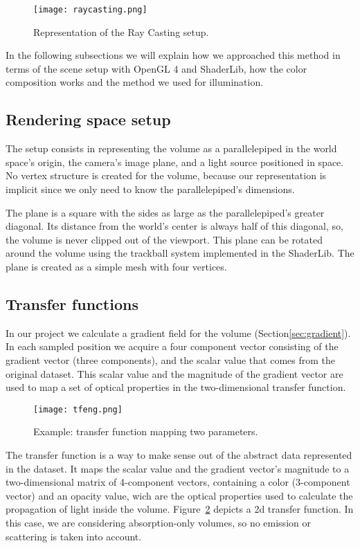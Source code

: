 \documentclass[10pt, conference]{IEEEtran}
\begin{document}
\begin{figure}[h]
\centering
\texttt{[image: raycasting.png]}
\caption{Representation of the Ray Casting setup.}
\label{fig:ray}
\end{figure}

In the following subsections we will explain how we approached this method in terms of the scene setup with OpenGL 4 and ShaderLib, how the color composition works and the method we used for illumination.


\subsection{Rendering space setup}
\label{sec:rss}

The setup consists in representing the volume as a parallelepiped in the world space's origin, the camera's image plane, and a light source positioned in space. No vertex structure is created for the volume, because our representation is implicit since we only need to know the parallelepiped's dimensions.

The plane is a square with the sides as large as the parallelepiped's greater diagonal. Its distance from the world's center is always half of this diagonal, so, the volume is never clipped out of the viewport. This plane can be rotated around the volume using the trackball system implemented in the ShaderLib. The plane is created as a simple mesh with four vertices.

\subsection{Transfer functions}
\label{sec:tf}

In our project we calculate a gradient field for the volume (Section\ref{sec:gradient}). In each sampled position we acquire a four component vector consisting of the gradient vector (three components), and the scalar value that comes from the original dataset. This scalar value and the magnitude of the gradient vector are used to map a set of optical properties in the two-dimensional transfer function.

\begin{figure}[h]
\centering
\texttt{[image: tfeng.png]}
\caption{Example: transfer function mapping two parameters.}
\label{fig:tf}
\end{figure}

The transfer function is a way to make sense out of the abstract data represented in the dataset. It maps the scalar value and the gradient vector's magnitude to a two-dimensional matrix of 4-component vectors, containing a color (3-component vector) and an opacity value, wich are the optical properties used to calculate the propagation of light inside the volume. Figure~\ref{fig:tf} depicts a 2d transfer function. In this case, we are considering absorption-only volumes, so no emission or scattering is taken into account.
\end{document}
